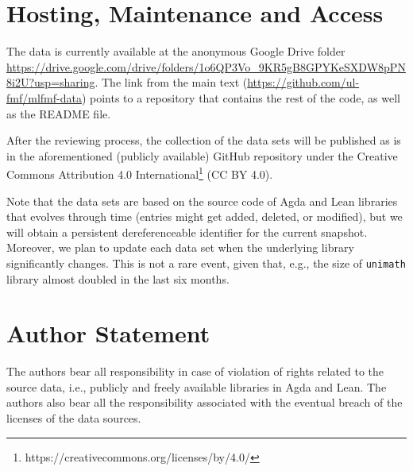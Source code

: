 \documentclass{article}
\begin{document}
\section{Hosting, Maintenance and Access}
The data is currently available at the anonymous Google Drive folder \url{https://drive.google.com/drive/folders/1o6QP3Vo_9KR5gB8GPYKeSXDW8pPN8i2U?usp=sharing}. The link from the main text (\url{https://github.com/ul-fmf/mlfmf-data}) points to a repository that contains the rest of the code, as well as the README file.

After the reviewing process, the collection of the data sets will be published as is in the aforementioned (publicly available) GitHub repository under the Creative Commons Attribution 4.0 International\footnote{https://creativecommons.org/licenses/by/4.0/} (CC BY 4.0). 

Note that the data sets are based on the source code of Agda and Lean libraries that evolves through time (entries might get added, deleted, or modified), but we will obtain a persistent dereferenceable identifier for the current snapshot. Moreover, we plan to update each data set when the underlying library significantly changes. This is not a rare event, given that, e.g., the size of \texttt{unimath} library almost doubled in the last six months.






\section{Author Statement}
The authors bear all responsibility in case of violation of rights related to the source data, i.e., publicly and freely available libraries in Agda and Lean. The authors also bear all the responsibility associated with the eventual breach of the licenses of the data sources.
\end{document}
